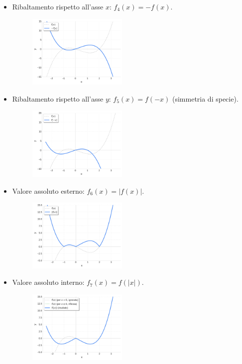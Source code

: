 \begin{itemize}
\item Ribaltamento rispetto all'asse $x$: $f_4(x) = -f(x)$.
    \begin{figure}[H]
    \centering
    \includegraphics[width=0.45\textwidth]{img/ribaltamento_x.png}
  \end{figure}

\item Ribaltamento rispetto all'asse $y$: $f_5(x) = f(-x)$ (simmetria di specie).
    \begin{figure}[H]
    \centering
    \includegraphics[width=0.45\textwidth]{img/ribaltamento_y.png}
  \end{figure}

\item Valore assoluto esterno: $f_6(x) = |f(x)|$.
    \begin{figure}[H]
    \centering
    \includegraphics[width=0.45\textwidth]{img/valore_assoluto_esterno.png}
  \end{figure}

\item Valore assoluto interno: $f_7(x) = f(|x|)$.
    \begin{figure}[H]
    \centering
    \includegraphics[width=0.45\textwidth]{img/valore_assoluto_interno.png}
  \end{figure}
\end{itemize}
